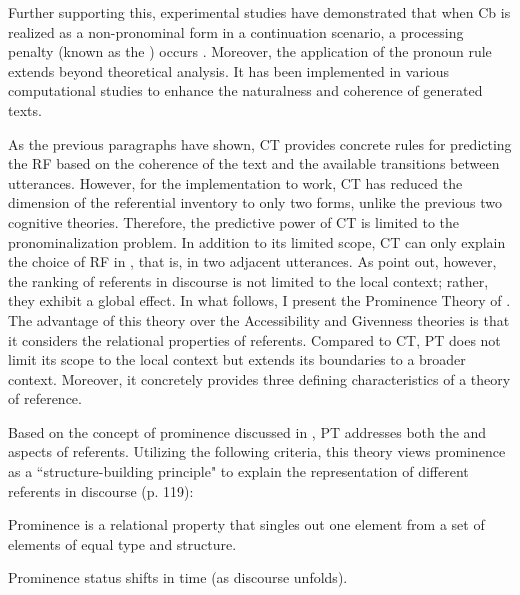 Further supporting this, experimental studies have demonstrated that when Cb is realized as a non-pronominal form in a continuation scenario, a processing penalty (known as the ) occurs \citep{Almor1999}. Moreover, the application of the pronoun rule extends beyond theoretical analysis. It has been implemented in various computational studies \citep{kibble1999using, poesio2004centering, poesio2004centering} to enhance the naturalness and coherence of generated texts.

As the previous paragraphs have shown, CT provides concrete rules for predicting the RF based on the coherence of the text and the available transitions between utterances. However, for the implementation to work, CT has reduced the dimension of the referential inventory to only two forms, unlike the previous two cognitive theories. Therefore, the predictive power of CT is limited to the pronominalization problem. In addition to its limited scope, CT can only explain the choice of RF in , that is, in two adjacent utterances. As \citet{Heusinger2019} point out, however, the ranking of referents in discourse is not limited to the local context; rather, they exhibit a global effect. In what follows, I present the Prominence Theory of \citet{Heusinger2019}. The advantage of this theory over the Accessibility and Givenness theories is that it considers the relational properties of referents. Compared to CT, PT does not limit its scope to the local context but extends its boundaries to a broader context. Moreover, it concretely provides three defining characteristics of a theory of reference.

Based on the concept of prominence discussed in \citet{himmelmann2015prominence}, PT \citep{Heusinger2019} addresses both the  and  aspects of referents. Utilizing the following criteria, this theory views prominence as a ``structure-building principle" to explain the representation of different referents in discourse (p. 119):

\begin{definition}
	Prominence is a relational property that singles out one element from a set of elements of equal type and structure.
\end{definition}

\begin{definition}[Dynamicity]
	Prominence status shifts in time (as discourse unfolds).
\end{definition}

